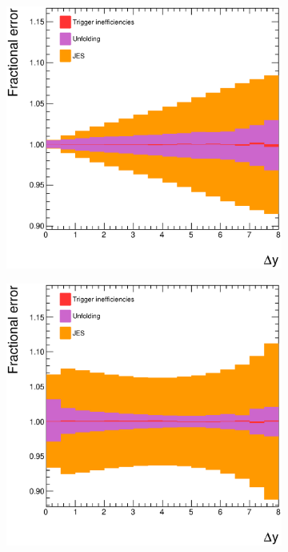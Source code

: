 \begin{figure}
\centering
        \begin{subfigure}[b]{0.5\textwidth}
                \centering
                \includegraphics[width=\textwidth]{figures/GBJ2/FinalPlots/GapFraction_dyBins.systematics.eps}
        \end{subfigure}%
        \begin{subfigure}[b]{0.5\textwidth}
                \centering
                \includegraphics[width=\textwidth]{figures/GBJ2/FinalPlots/nGapJets_dyBins.systematics.eps}

\end{subfigure}
\end{figure}
